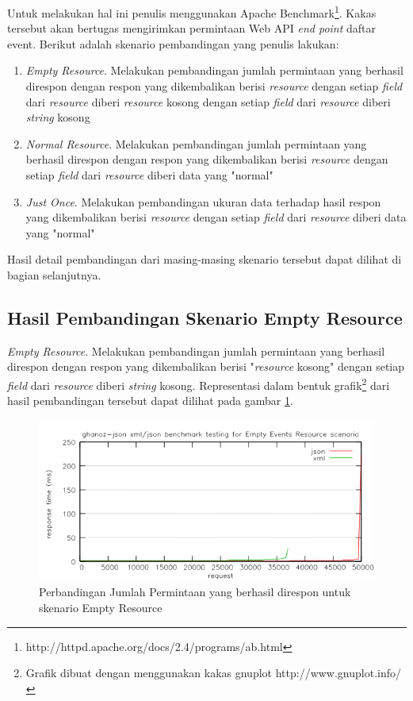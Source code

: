 \documentclass[a4paper, 12pt, oneside]{report}
\begin{document}
Untuk melakukan hal ini penulis menggunakan Apache Benchmark\footnote{http://httpd.apache.org/docs/2.4/programs/ab.html}. Kakas tersebut akan bertugas mengirimkan permintaan Web API \textit{end point} daftar event. Berikut adalah skenario pembandingan yang penulis lakukan:

\begin{enumerate}
  \item \textit{Empty Resource}. Melakukan pembandingan jumlah permintaan yang berhasil direspon dengan respon yang dikembalikan berisi \textit{resource} dengan setiap \textit{field} dari \textit{resource} diberi \textit{resource} kosong dengan setiap \textit{field} dari \textit{resource} diberi \textit{string} kosong
  \item \textit{Normal Resource}. Melakukan pembandingan jumlah permintaan yang berhasil direspon dengan respon yang dikembalikan berisi \textit{resource} dengan setiap \textit{field} dari \textit{resource} diberi data yang "normal"
  \item \textit{Just Once}. Melakukan pembandingan ukuran data terhadap hasil respon yang dikembalikan berisi \textit{resource} dengan setiap \textit{field} dari \textit{resource} diberi data yang "normal"
\end{enumerate}

Hasil detail pembandingan dari masing-masing skenario tersebut dapat dilihat di bagian selanjutnya.

\subsection{Hasil Pembandingan Skenario Empty Resource}

\onehalfspacing \textit{Empty Resource}. Melakukan pembandingan jumlah permintaan yang berhasil direspon dengan respon yang dikembalikan berisi "\textit{resource} kosong" dengan setiap \textit{field} dari \textit{resource} diberi \textit{string} kosong. Representasi dalam bentuk grafik\footnote{Grafik dibuat dengan menggunakan kakas gnuplot http://www.gnuplot.info/} dari hasil pembandingan tersebut dapat dilihat pada gambar \ref{benchmark-empty-resource}.

\begin{figure}[htp]
\centering
\includegraphics[scale=0.65]{images/benchmark-empty-resource.png}
\caption{Perbandingan Jumlah Permintaan yang berhasil direspon untuk skenario Empty Resource}
\label{benchmark-empty-resource}
\end{figure}
\end{document}
